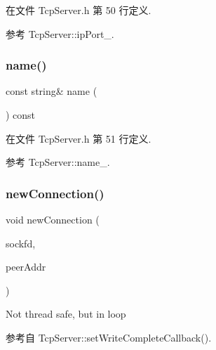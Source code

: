 在文件 Tcp\+Server.\+h 第 50 行定义.



参考 Tcp\+Server\+::ip\+Port\+\_\+.

\mbox{\label{classmuduo_1_1net_1_1TcpServer_a47f4f0a66d5a539e687100dc65462ced}} 
\subsubsection{\texorpdfstring{name()}{name()}}
{\footnotesize\ttfamily const string\& name (\begin{DoxyParamCaption}{ }\end{DoxyParamCaption}) const\hspace{0.3cm}{\ttfamily [inline]}}



在文件 Tcp\+Server.\+h 第 51 行定义.



参考 Tcp\+Server\+::name\+\_\+.

\mbox{\label{classmuduo_1_1net_1_1TcpServer_a6e7510f45cfa67ddc79aa8689fd79562}} 
\subsubsection{\texorpdfstring{new\+Connection()}{newConnection()}}
{\footnotesize\ttfamily void new\+Connection (\begin{DoxyParamCaption}\item[{int}]{sockfd,  }\item[{const \hyperlink{classmuduo_1_1net_1_1InetAddress}{Inet\+Address} \&}]{peer\+Addr }\end{DoxyParamCaption})\hspace{0.3cm}{\ttfamily [private]}}



Not thread safe, but in loop 



参考自 Tcp\+Server\+::set\+Write\+Complete\+Callback().

